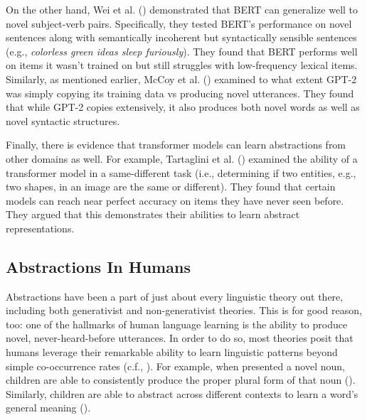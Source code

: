 \documentclass[
  nottoc]{article}
\begin{document}
On the other hand, Wei et al. ()
demonstrated that BERT can generalize well to novel subject-verb pairs.
Specifically, they tested BERT's performance on novel sentences along
with semantically incoherent but syntactically sensible sentences (e.g.,
\emph{colorless green ideas sleep furiously}). They found that BERT
performs well on items it wasn't trained on but still struggles with
low-frequency lexical items. Similarly, as mentioned earlier, McCoy et
al. () examined to what extent GPT-2
was simply copying its training data vs producing novel utterances. They
found that while GPT-2 copies extensively, it also produces both novel
words as well as novel syntactic structures.

Finally, there is evidence that transformer models can learn
abstractions from other domains as well. For example, Tartaglini et al.
() examined the ability of a
transformer model in a same-different task (i.e., determining if two
entities, e.g., two shapes, in an image are the same or different). They
found that certain models can reach near perfect accuracy on items they
have never seen before. They argued that this demonstrates their
abilities to learn abstract representations.

\subsection{Abstractions In Humans}\label{abstractions-in-humans}

Abstractions have been a part of just about every linguistic theory out
there, including both generativist and non-generativist theories. This
is for good reason, too: one of the hallmarks of human language learning
is the ability to produce novel, never-heard-before utterances. In order
to do so, most theories posit that humans leverage their remarkable
ability to learn linguistic patterns beyond simple co-occurrence rates
(c.f., ). For example, when
presented a novel noun, children are able to consistently produce the
proper plural form of that noun ().
Similarly, children are able to abstract across different contexts to
learn a word's general meaning ().
\end{document}
